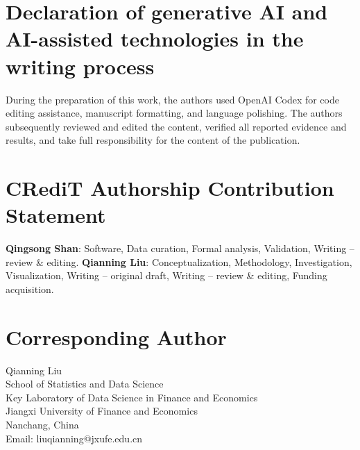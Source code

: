 \documentclass[
  number,
  preprint]{elsarticle}
\begin{document}
\section*{Declaration of generative AI and AI-assisted technologies in
the writing
process}\label{declaration-of-generative-ai-and-ai-assisted-technologies-in-the-writing-process}

During the preparation of this work, the authors used OpenAI Codex for
code editing assistance, manuscript formatting, and language polishing.
The authors subsequently reviewed and edited the content, verified all
reported evidence and results, and take full responsibility for the
content of the publication.

\section*{CRediT Authorship Contribution
Statement}\label{credit-authorship-contribution-statement}

\textbf{Qingsong Shan}: Software, Data curation, Formal analysis,
Validation, Writing -- review \& editing. \textbf{Qianning Liu}:
Conceptualization, Methodology, Investigation, Visualization, Writing --
original draft, Writing -- review \& editing, Funding acquisition.

\section*{Corresponding Author}\label{corresponding-author}

Qianning Liu\\
School of Statistics and Data Science\\
Key Laboratory of Data Science in Finance and Economics\\
Jiangxi University of Finance and Economics\\
Nanchang, China\\
Email: liuqianning@jxufe.edu.cn



\end{document}
